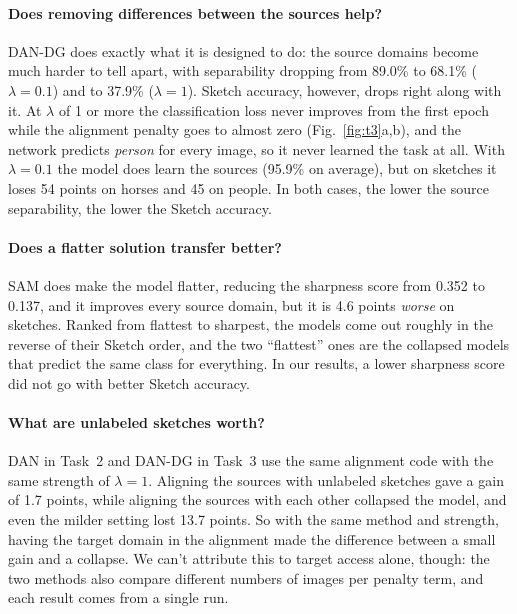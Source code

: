 \documentclass{article}
\begin{document}
\paragraph{Does removing differences between the sources help?} DAN-DG does exactly what it is designed to do: the source domains become much harder to tell apart, with separability dropping from 89.0\% to 68.1\% ($\lambda{=}0.1$) and to 37.9\% ($\lambda{=}1$). Sketch accuracy, however, drops right along with it. At $\lambda$ of 1 or more the classification loss never improves from the first epoch while the alignment penalty goes to almost zero (Fig.~\ref{fig:t3}a,b), and the network predicts \emph{person} for every image, so it never learned the task at all. With $\lambda{=}0.1$ the model does learn the sources (95.9\% on average), but on sketches it loses 54 points on horses and 45 on people. In both cases, the lower the source separability, the lower the Sketch accuracy.

\paragraph{Does a flatter solution transfer better?} SAM does make the model flatter, reducing the sharpness score from 0.352 to 0.137, and it improves every source domain, but it is 4.6 points \emph{worse} on sketches. Ranked from flattest to sharpest, the models come out roughly in the reverse of their Sketch order, and the two ``flattest'' ones are the collapsed models that predict the same class for everything. In our results, a lower sharpness score did not go with better Sketch accuracy.

\paragraph{What are unlabeled sketches worth?} DAN in Task~2 and DAN-DG in Task~3 use the same alignment code with the same strength of $\lambda{=}1$. Aligning the sources with unlabeled sketches gave a gain of 1.7 points, while aligning the sources with each other collapsed the model, and even the milder setting lost 13.7 points. So with the same method and strength, having the target domain in the alignment made the difference between a small gain and a collapse. We can't attribute this to target access alone, though: the two methods also compare different numbers of images per penalty term, and each result comes from a single run.

\end{document}
